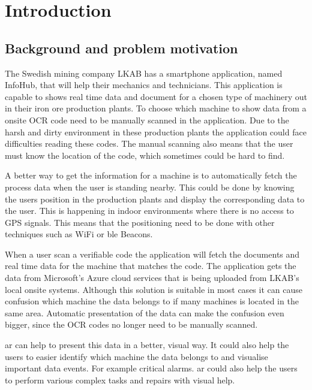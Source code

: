 \chapter{Introduction}\label{introduction}

\section{Background and problem motivation}
The Swedish mining company LKAB has a smartphone application, named InfoHub, that will help their mechanics and technicians.
This application is capable to shows real time data and document for a chosen type of machinery out in their iron ore production plants.
To choose which machine to show data from a onsite OCR code need to be manually scanned in the application.
Due to the harsh and dirty environment in these production plants the application could face difficulties reading these codes.
The manual scanning also means that the user must know the location of the code, which sometimes could be hard to find.

\bigskip

A better way to get the information for a machine is to automatically fetch the process data when the user is standing nearby.
This could be done by knowing the users position in the production plants and display the corresponding data to the user.
This is happening in indoor environments where there is no access to GPS signals.
This means that the positioning need to be done with other techniques such as WiFi or \acrlong{ble} Beacons.

\bigskip

When a user scan a verifiable code the application will fetch the documents and real time data for the machine that matches the code.
The application gets the data from Microsoft's Azure cloud services that is being uploaded from LKAB's local onsite systems.
Although this solution is suitable in most cases it can cause confusion which machine the data belongs to if many machines is located in the same area.
Automatic presentation of the data can make the confusion even bigger, since the OCR codes no longer need to be manually scanned.

\bigskip

\acrfull{ar} can help to present this data in a better, visual way.
It could also help the users to easier identify which machine the data belongs to and visualise important data events.
For example critical alarms.
\acrshort{ar} could also help the users to perform various complex tasks and repairs with visual help.


